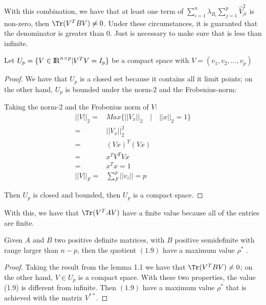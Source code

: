 With this combination, we have that at least one term of $\sum\limits_{i=1}^{n} \lambda_{B_i} \sum \limits_{j=1}^{p} \widehat{V}_{ji}^2 $ is non-zero, then $\Tr(V^T B V) \neq 0$. Under these circumstances, it is guaranted that the denominator is greater than 0. Just is necessary to make sure that is less than infinite.

\begin{lemma}
Let $U_p = \{ V \in {\rm I\!R}^{n \times p} | V^T V = I_p \} $ be a compact space with $V = (v_1, v_2, ... , v_p)$
\end{lemma}
\begin{proof}
We have that $U_p$ is a closed set because it contains all it limit points; on the other hand, $U_p$ is bounded under the norm-2 and the Frobenius-norm:

Taking the norm-2 and the Frobenius norm of $V$: 
\begin{equation*}
\begin{aligned}
	||V||_2 =& Max \{||V_x ||_2 \quad | \quad ||x||_2 = 1 \} \\
		    =& ||V_x||^2_2  \\
		    =& (Vx)^T (Vx) \\
		    =& x^T V^T V x\\
		    =& x^T x = 1\\
	||V||_F	=& \sum\limits_{F}^{p} ||v_i|| = p   
\end{aligned}
\end{equation*}

Then $U_p$ is closed and bounded, then $U_p$ is a compact space.
\end{proof}

With this, we have that $\Tr(V^T A V)$ have a finite value because all of the entries are finite.

\begin{lemma}\label{lemma2.5}
Given $A$ and $B$ two positive definite matrices, with $B$ positive semidefinite with range larger than $n-p$, then the quotient $(1.9)$ have a maximum value $\rho^*$ \cite{ngo2012trace}.
\end{lemma}

\begin{proof}
Taking the result from the lemma 1.1 we have that $\Tr(V^T B V) \neq 0$; on the other hand, $V \in U_p$ is a compact space. With these two properties, the value (1.9) is different from infinite. Then $(1.9)$ have a maximum value $\rho^*$ that is achieved with the matrix $V^{**}$.
\end{proof}

